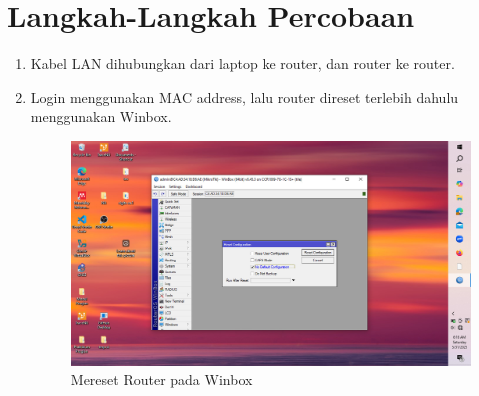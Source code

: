 \section{Langkah-Langkah Percobaan}

\begin{enumerate}
    \item Kabel LAN dihubungkan dari laptop ke router, dan router ke router.
    \item Login menggunakan MAC address, lalu router direset terlebih dahulu menggunakan Winbox.
    \begin{figure}[H]
        \centering
        \includegraphics[width=0.5\linewidth]{gambar1.jpeg}
        \caption{Mereset Router pada Winbox}
        \label{fig:reset-router}
    \end{figure}


\end{enumerate}
